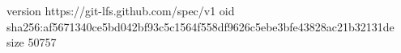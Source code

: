 version https://git-lfs.github.com/spec/v1
oid sha256:af5671340ce5bd042bf93c5c1564f558df9626c5ebe3bfe43828ac21b32131de
size 50757
